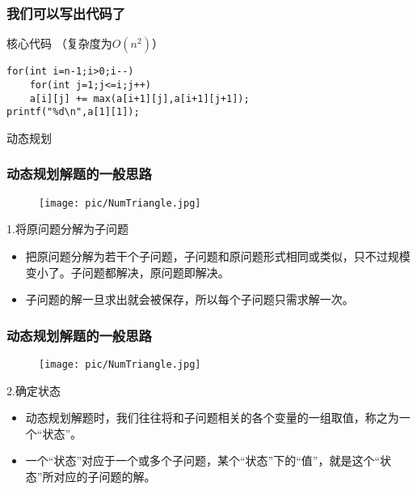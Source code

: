 \documentclass{beamer}
\begin{document}
\begin{frame}[fragile]
\frametitle{我们可以写出代码了}
\begin{block}{核心代码  （复杂度为$O(n^2)$）}
	\begin{lstlisting}
for(int i=n-1;i>0;i--)
    for(int j=1;j<=i;j++)
	a[i][j] += max(a[i+1][j],a[i+1][j+1]);
printf("%d\n",a[1][1]);
	\end{lstlisting}
\end{block}
动态规划
\end{frame}
\begin{frame}[fragile]
\frametitle{动态规划解题的一般思路}

\begin{minipage}[b]{0.30\linewidth}
	\begin{figure}
		\centering
		\texttt{[image: pic/NumTriangle.jpg]}
	\end{figure}
	
\end{minipage}
\hfill
\begin{minipage}[b]{0.65\linewidth}
	
	\begin{block}{1.将原问题分解为子问题}
		\begin{itemize}
			\item 把原问题分解为若干个子问题，子问题和原问题形式相同或类似，只不过规模变小了。子问题都解决，原问题即解决。
			\item 子问题的解一旦求出就会被保存，所以每个子问题只需求解一次。
		\end{itemize}
	\end{block}
\end{minipage}



\end{frame}

\begin{frame}[fragile]
\frametitle{动态规划解题的一般思路}

\begin{minipage}[b]{0.30\linewidth}
\begin{figure}
	\centering
	\texttt{[image: pic/NumTriangle.jpg]}
\end{figure}

\end{minipage}
\hfill
\begin{minipage}[b]{0.65\linewidth}

\begin{block}{2.确定状态}
	\begin{itemize}
		\item 动态规划解题时，我们往往将和子问题相关的各个变量的一组取值，称之为一个“状态”。
		\item 一个“状态”对应于一个或多个子问题，某个“状态”下的“值”，就是这个“状态”所对应的子问题的解。
	\end{itemize}
\end{block}
\end{minipage}
\end{frame}
\end{document}
